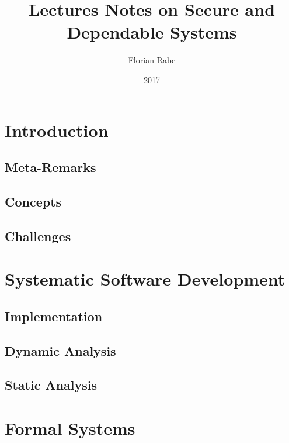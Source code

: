 \documentclass{book}
\title{Lectures Notes on Secure and Dependable Systems}
\author{Florian Rabe}
\date{2017}
\begin{document}
\maketitle

\tableofcontents
\newpage

\part{Introduction}

 \chapter{Meta-Remarks}
  

  \chapter{Concepts}
   

 \chapter{Challenges}
   

\part{Systematic Software Development}

  \chapter{Implementation}\label{sec:sd:systimpl}
    

  \chapter{Dynamic Analysis}\label{sec:sd:dynamic}
    

  \chapter{Static Analysis}\label{sec:sd:static}
    
    
\part{Formal Systems}

   
\end{document}
